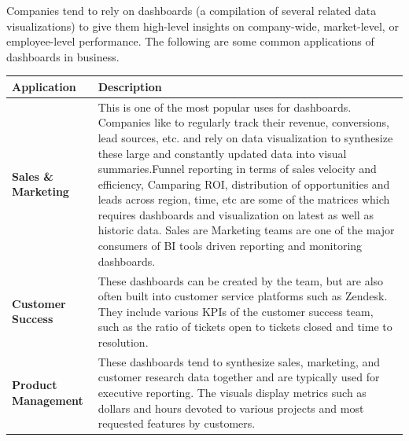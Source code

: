 \documentclass[]{book}
\theoremstyle{definition}
\theoremstyle{definition}
\theoremstyle{definition}
\theoremstyle{remark}
\begin{document}
Companies tend to rely on dashboards (a compilation of several related
data visualizations) to give them high-level insights on company-wide,
market-level, or employee-level performance. The following are some
common applications of dashboards in business.

\begin{longtable}[]{@{}ll@{}}
\toprule
\begin{minipage}[b]{0.16\columnwidth}\raggedright\strut
\textbf{Application}\strut
\end{minipage} & \begin{minipage}[b]{0.78\columnwidth}\raggedright\strut
\textbf{Description}\strut
\end{minipage}\tabularnewline
\midrule
\endhead
\begin{minipage}[t]{0.16\columnwidth}\raggedright\strut
\textbf{Sales \& Marketing}\strut
\end{minipage} & \begin{minipage}[t]{0.78\columnwidth}\raggedright\strut
This is one of the most popular uses for dashboards. Companies like to
regularly track their revenue, conversions, lead sources, etc. and rely
on data visualization to synthesize these large and constantly updated
data into visual summaries.Funnel reporting in terms of sales velocity
and efficiency, Camparing ROI, distribution of opportunities and leads
across region, time, etc are some of the matrices which requires
dashboards and visualization on latest as well as historic data. Sales
are Marketing teams are one of the major consumers of BI tools driven
reporting and monitoring dashboards.\strut
\end{minipage}\tabularnewline
\begin{minipage}[t]{0.16\columnwidth}\raggedright\strut
\textbf{Customer Success}\strut
\end{minipage} & \begin{minipage}[t]{0.78\columnwidth}\raggedright\strut
These dashboards can be created by the team, but are also often built
into customer service platforms such as Zendesk. They include various
KPIs of the customer success team, such as the ratio of tickets open to
tickets closed and time to resolution.\strut
\end{minipage}\tabularnewline
\begin{minipage}[t]{0.16\columnwidth}\raggedright\strut
\textbf{Product Management}\strut
\end{minipage} & \begin{minipage}[t]{0.78\columnwidth}\raggedright\strut
These dashboards tend to synthesize sales, marketing, and customer
research data together and are typically used for executive reporting.
The visuals display metrics such as dollars and hours devoted to various
projects and most requested features by customers.\strut
\end{minipage}\tabularnewline
\bottomrule
\end{longtable}
\end{document}
